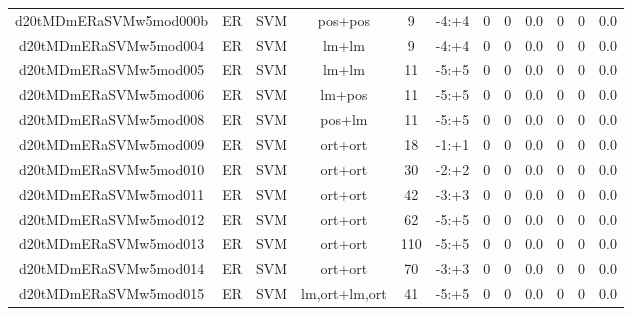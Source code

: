 \documentclass[a4paper]{article}
\begin{document}
\begin{landscape}
\begin{center}
\begin{tabular}{ |c|c|c|c|c|c|c|c|c|c|c|c|}
 
 	
 	\small{ d20tMDmERaSVMw5mod000b } & ER & SVM & pos+pos  &  9 &  -4:+4  &  0 & 0 & 0.0  &  0 & 0 & 0.0 \\
 	

 
 	
 	\small{ d20tMDmERaSVMw5mod004 } & ER & SVM & lm+lm  &  9 &  -4:+4  &  0 & 0 & 0.0  &  0 & 0 & 0.0 \\
 	

 
 	
 	\small{ d20tMDmERaSVMw5mod005 } & ER & SVM & lm+lm  &  11 &  -5:+5  &  0 & 0 & 0.0  &  0 & 0 & 0.0 \\
 	

 
 	
 	\small{ d20tMDmERaSVMw5mod006 } & ER & SVM & lm+pos  &  11 &  -5:+5  &  0 & 0 & 0.0  &  0 & 0 & 0.0 \\
 	

 
 	
 	\small{ d20tMDmERaSVMw5mod008 } & ER & SVM & pos+lm  &  11 &  -5:+5  &  0 & 0 & 0.0  &  0 & 0 & 0.0 \\
 	

 
 	
 	\small{ d20tMDmERaSVMw5mod009 } & ER & SVM & ort+ort  &  18 &  -1:+1  &  0 & 0 & 0.0  &  0 & 0 & 0.0 \\
 	

 
 	
 	\small{ d20tMDmERaSVMw5mod010 } & ER & SVM & ort+ort  &  30 &  -2:+2  &  0 & 0 & 0.0  &  0 & 0 & 0.0 \\
 	

 
 	
 	\small{ d20tMDmERaSVMw5mod011 } & ER & SVM & ort+ort  &  42 &  -3:+3  &  0 & 0 & 0.0  &  0 & 0 & 0.0 \\
 	

 
 	
 	\small{ d20tMDmERaSVMw5mod012 } & ER & SVM & ort+ort  &  62 &  -5:+5  &  0 & 0 & 0.0  &  0 & 0 & 0.0 \\
 	

 
 	
 	\small{ d20tMDmERaSVMw5mod013 } & ER & SVM & ort+ort  &  110 &  -5:+5  &  0 & 0 & 0.0  &  0 & 0 & 0.0 \\
 	

 
 	
 	\small{ d20tMDmERaSVMw5mod014 } & ER & SVM & ort+ort  &  70 &  -3:+3  &  0 & 0 & 0.0  &  0 & 0 & 0.0 \\
 	

 
 	
 	\small{ d20tMDmERaSVMw5mod015 } & ER & SVM & lm,ort+lm,ort  &  41 &  -5:+5  &  0 & 0 & 0.0  &  0 & 0 & 0.0 \\
 	


\end{tabular}
\end{center}
\end{landscape}
\end{document}
